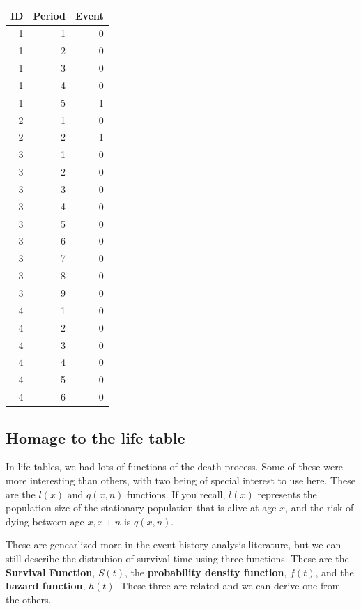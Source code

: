 \documentclass[
]{article}
\begin{document}
\begin{table}
\centering
\begin{tabular}{|>{}r|||>{}r|||>{}r|}
\hline
ID & Period & Event\\
\hline
1 & 1 & 0\\
\hline
1 & 2 & 0\\
\hline
1 & 3 & 0\\
\hline
1 & 4 & 0\\
\hline
1 & 5 & 1\\
\hline
2 & 1 & 0\\
\hline
2 & 2 & 1\\
\hline
3 & 1 & 0\\
\hline
3 & 2 & 0\\
\hline
3 & 3 & 0\\
\hline
3 & 4 & 0\\
\hline
3 & 5 & 0\\
\hline
3 & 6 & 0\\
\hline
3 & 7 & 0\\
\hline
3 & 8 & 0\\
\hline
3 & 9 & 0\\
\hline
4 & 1 & 0\\
\hline
4 & 2 & 0\\
\hline
4 & 3 & 0\\
\hline
4 & 4 & 0\\
\hline
4 & 5 & 0\\
\hline
4 & 6 & 0\\
\hline
\end{tabular}
\end{table}

\hypertarget{homage-to-the-life-table}{%
\subsection{Homage to the life table}\label{homage-to-the-life-table}}

In life tables, we had lots of functions of the death process. Some of these were more interesting than others, with two being of special interest to use here. These are the \(l(x)\) and \(q(x, n)\) functions. If you recall, \(l(x)\) represents the population size of the stationary population that is alive at age \(x\), and the risk of dying between age \(x, x+n\) is \(q(x, n)\).

These are genearlized more in the event history analysis literature, but we can still describe the distrubion of survival time using three functions. These are the \textbf{Survival Function}, \(S(t)\), the \textbf{probability density function}, \(f(t)\), and the \textbf{hazard function}, \(h(t)\). These three are related and we can derive one from the others.
\end{document}
